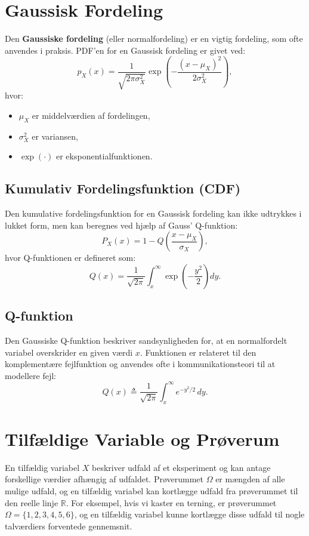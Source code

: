 \documentclass[a4paper,12pt]{book}
\begin{document}
	\section{Gaussisk Fordeling}
	Den \textbf{Gaussiske fordeling} (eller normalfordeling) er en vigtig fordeling, som ofte anvendes i praksis. PDF'en for en Gaussisk fordeling er givet ved:
	\[
	p_X(x) = \frac{1}{\sqrt{2\pi \sigma_X^2}} \exp\left( - \frac{(x - \mu_X)^2}{2 \sigma_X^2} \right),
	\]
	hvor:
	\begin{itemize}
		\item \( \mu_X \) er middelværdien af fordelingen,
		\item \( \sigma_X^2 \) er variansen,
		\item \( \exp(\cdot) \) er eksponentialfunktionen.
	\end{itemize}
	
	\subsection{Kumulativ Fordelingsfunktion (CDF)}
	Den kumulative fordelingsfunktion for en Gaussisk fordeling kan ikke udtrykkes i lukket form, men kan beregnes ved hjælp af Gauss' Q-funktion:
	\[
	P_X(x) = 1 - Q\left( \frac{x - \mu_X}{\sigma_X} \right),
	\]
	hvor Q-funktionen er defineret som:
	\[
	Q(x) = \frac{1}{\sqrt{2\pi}} \int_x^{\infty} \exp\left( -\frac{y^2}{2} \right) dy.
	\]
	
	\subsection{Q-funktion}
	Den Gaussiske Q-funktion beskriver sandsynligheden for, at en normalfordelt variabel overskrider en given værdi \( x \). Funktionen er relateret til den komplementære fejlfunktion og anvendes ofte i kommunikationsteori til at modellere fejl:
	\[
	Q(x) \triangleq \frac{1}{\sqrt{2\pi}} \int_x^{\infty} e^{-y^2/2} \, dy.
	\]
	
	\section{Tilfældige Variable og Prøverum}
	En tilfældig variabel \( X \) beskriver udfald af et eksperiment og kan antage forskellige værdier afhængig af udfaldet. Prøverummet \( \Omega \) er mængden af alle mulige udfald, og en tilfældig variabel kan kortlægge udfald fra prøverummet til den reelle linje \( \mathbb{R} \). For eksempel, hvis vi kaster en terning, er prøverummet \( \Omega = \{1, 2, 3, 4, 5, 6\} \), og en tilfældig variabel kunne kortlægge disse udfald til nogle talværdiers forventede gennemsnit.
	
\end{document}
